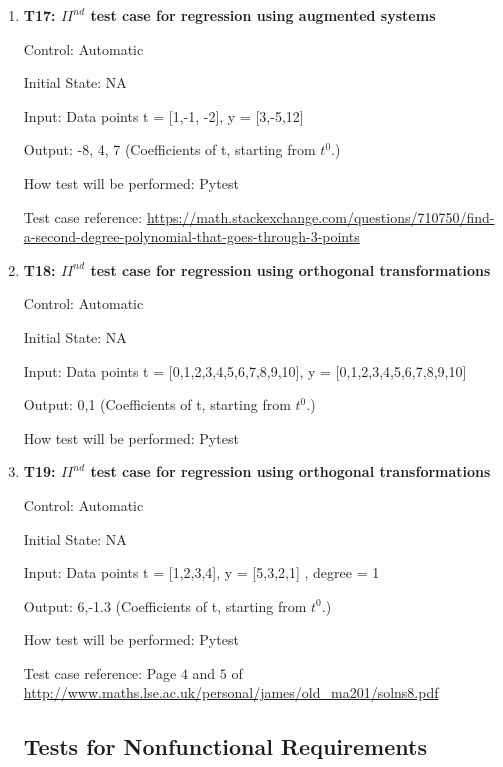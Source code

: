 \documentclass[12pt, titlepage]{article}
\begin{document}
\begin{enumerate}
\item{\textbf{T17: ${II}^{nd}$ test case for regression using augmented systems}\\}

Control: Automatic

Initial State: NA

Input: Data points t = [1,-1, -2], y = [3,-5,12] 

Output: -8, 4, 7 (Coefficients of t, starting from $t^{0}$.)

How test will be performed: Pytest

Test case reference: \url{https://math.stackexchange.com/questions/710750/find-a-second-degree-polynomial-that-goes-through-3-points}\\


\item{\textbf{T18: ${II}^{nd}$ test case for regression using orthogonal transformations}\\}

Control: Automatic

Initial State: NA

Input: Data points t = [0,1,2,3,4,5,6,7,8,9,10], y = [0,1,2,3,4,5,6,7,8,9,10] 

Output: 0,1 (Coefficients of t, starting from $t^{0}$.)

How test will be performed: Pytest\\


\item{\textbf{T19: ${II}^{nd}$ test case for regression using orthogonal transformations}\\}

Control: Automatic

Initial State: NA

Input: Data points t = [1,2,3,4], y = [5,3,2,1] , degree = 1

Output: 6,-1.3 (Coefficients of t, starting from $t^{0}$.)

How test will be performed: Pytest

Test case reference: Page $4$ and $5$ of \url{http://www.maths.lse.ac.uk/personal/james/old_ma201/solns8.pdf}\\



\subsection{Tests for Nonfunctional Requirements}




\end{enumerate}
\end{document}
